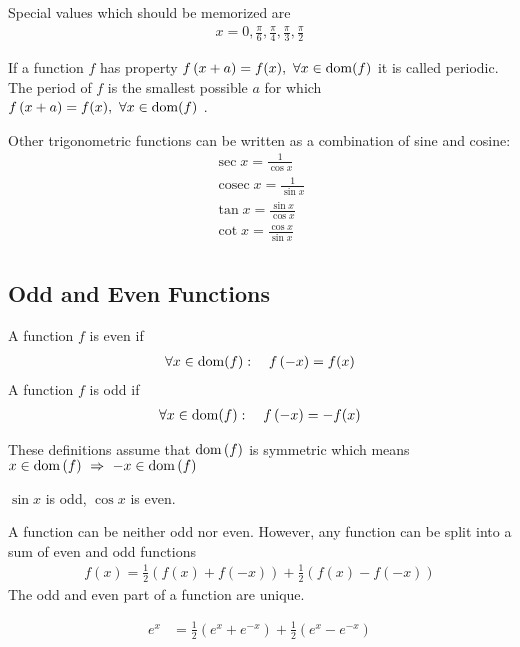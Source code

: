 \begin{rk}
Special values which should be memorized are
\begin{align*}
x=0,\frac \pi 6, \frac \pi 4, \frac \pi 3, \frac \pi 2
\end{align*}
\end{rk}
\begin{df}
If a function $f$ has property $f\left( x+a\right) = f(x), ~ \forall x \in\operatorname{dom} ( f)$ it is called periodic. The period of $f$ is the smallest possible $a$ for which $f\left( x+a\right) = f(x), ~ \forall x \in\operatorname{dom} ( f)$ .
\end{df}

\begin{df}
Other trigonometric functions can be written as a combination of sine and cosine:
\begin{align*}
\sec x = \frac 1 {\cos x} \\
\operatorname{cosec} x = \frac 1 {\sin x} \\
\tan x = \frac{\sin x}{\cos x} \\
\cot x = \frac{\cos x}{\sin x} \\
\end{align*}
\end{df}
\subsection{Odd and Even Functions}
\begin{df}
A function $f$ is even if
\begin{align*}
  \forall x \in\operatorname{dom} ( f): \quad f\left( -x\right) = f(x)
\end{align*}
A function $f$ is odd if
\begin{align*}
 \forall x \in\operatorname{dom} ( f): \quad f\left( -x\right) = -f(x)
\end{align*}
\end{df}
\begin{rk} 
These definitions assume that $\operatorname{dom}\left( f\right)$ is symmetric which means $x \in \operatorname{dom} \left( f\right) ~ \Rightarrow ~-x \in \operatorname{dom}\left( f\right)$ 
\end{rk}
\begin{ex} $\sin x$ is odd, $\cos x$ is even.
 \end{ex}
 \begin{pr}
 A function can be neither odd nor even.
 However, any function can be split into a sum of even and odd functions
 \begin{align*}
 f(x) = \frac 1 2 \left(  f(x) + f\left( -x\right)\right) + \frac 1 2 \left(  f(x)-f\left( -x\right)\right)
 \end{align*}
 The odd and even part of a function are unique.
 \end{pr}
 \begin{ex}
 \begin{align*}
 e^x & = \frac 1 2\left( e^x + e^{-x}\right) + \frac 1 2 \left( e^x - e^{-x}\right) 
 \end{align*}
 \end{ex}
